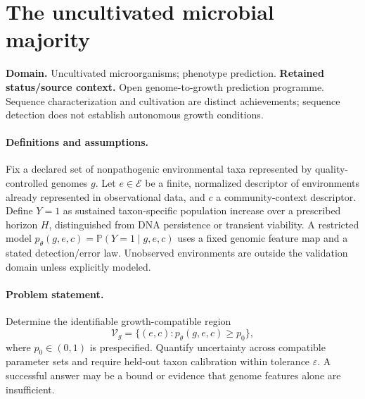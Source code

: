 \documentclass[11pt]{article}
\begin{document}
\section*{The uncultivated microbial majority}
\label{prob:313}
\label{rank:201}
\par\smallskip

\noindent\textbf{Domain.} Uncultivated microorganisms; phenotype prediction. \quad \textbf{Retained status/source context.} Open genome-to-growth prediction programme. Sequence characterization and cultivation are distinct achievements; sequence detection does not establish autonomous growth conditions.

\paragraph{Definitions and assumptions.} Fix a declared set of nonpathogenic environmental taxa represented by quality-controlled genomes $g$. Let $e\in\mathcal E$ be a finite, normalized descriptor of environments already represented in observational data, and $c$ a community-context descriptor. Define $Y=1$ as sustained taxon-specific population increase over a prescribed horizon $H$, distinguished from DNA persistence or transient viability. A restricted model $p_\theta(g,e,c)=\mathbb{P}(Y=1\mid g,e,c)$ uses a fixed genomic feature map and a stated detection/error law. Unobserved environments are outside the validation domain unless explicitly modeled.

\paragraph{Problem statement.} Determine the identifiable growth-compatible region
    \[\mathcal V_g=\{(e,c):p_\theta(g,e,c)\geq p_0\},\]
    where $p_0\in(0,1)$ is prespecified. Quantify uncertainty across compatible parameter sets and require held-out taxon calibration within tolerance $\varepsilon$. A successful answer may be a bound or evidence that genome features alone are insufficient.
\end{document}
